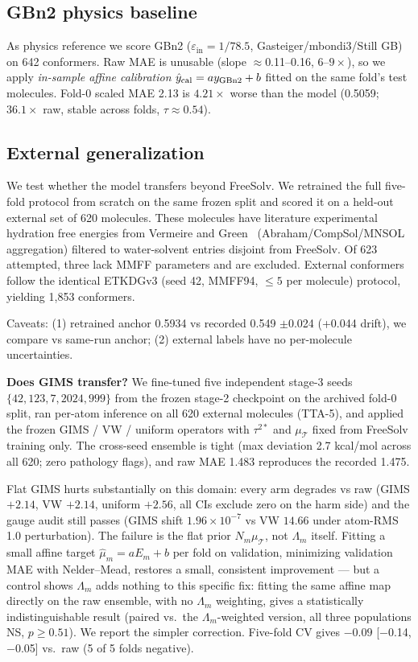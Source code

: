 \documentclass{article}
\begin{document}
\subsection{GBn2 physics baseline}

As physics reference we score GBn2 ($\varepsilon_{\text{in}}=1/78.5$, Gasteiger/mbondi3/Still GB) on 642 conformers. Raw MAE is unusable (slope $\approx$0.11--0.16, $6$--$9\times$), so we apply \emph{in-sample affine calibration} $\hat y_{\rm cal}=a y_{\rm GBn2}+b$ fitted on the same fold's test molecules. Fold-0 scaled MAE 2.13 is $4.21\times$ worse than the model (0.5059; $36.1\times$ raw, stable across folds, $\tau\approx0.54$).

\subsection{External generalization}

We test whether the model transfers beyond FreeSolv. We retrained the full
five-fold protocol from scratch on the same frozen split and scored it on a
held-out external set of 620 molecules. These molecules have literature
experimental hydration free energies from Vermeire and Green~\cite{vermeire2021}
(Abraham/CompSol/MNSOL aggregation) filtered to water-solvent entries disjoint
from FreeSolv. Of 623 attempted, three lack MMFF parameters and are excluded.
External conformers follow the identical ETKDGv3 (seed 42, MMFF94, $\le5$ per
molecule) protocol, yielding 1{,}853 conformers.

Caveats: (1) retrained anchor 0.5934 vs recorded 0.549 $\pm$0.024 (+0.044 drift), we compare vs same-run anchor; (2) external labels have no per-molecule uncertainties.

\textbf{Does GIMS transfer?} We fine-tuned five independent stage-3 seeds
$\{42,123,7,2024,999\}$ from the frozen stage-2 checkpoint on the archived
fold-0 split, ran per-atom inference on all 620 external molecules (TTA-5),
and applied the frozen GIMS / VW / uniform operators with $\tau^{2*}$ and
$\mu_{\mathcal T}$ fixed from FreeSolv training only. The cross-seed ensemble
is tight (max deviation 2.7 kcal/mol across all 620; zero pathology flags),
and raw MAE 1.483 reproduces the recorded 1.475.

Flat GIMS hurts substantially on this domain: every arm degrades vs raw (GIMS
$+2.14$, VW $+2.14$, uniform $+2.56$, all CIs exclude zero on the harm side)
and the gauge audit still passes (GIMS shift $1.96\times10^{-7}$ vs VW $14.66$
under atom-RMS 1.0 perturbation). The failure is the flat prior
$N_m\mu_{\mathcal T}$, not $\Lambda_m$ itself. Fitting a small affine target $\hat\mu_m=aE_m+b$ per fold on validation,
minimizing validation MAE with Nelder--Mead, restores a small, consistent
improvement — but a control shows $\Lambda_m$ adds nothing to this specific
fix: fitting the same affine map directly on the raw ensemble, with no
$\Lambda_m$ weighting, gives a statistically indistinguishable result
(paired vs.\ the $\Lambda_m$-weighted version, all three populations NS,
$p\ge0.51$). We report the simpler correction. Five-fold CV gives $-0.09$
[$-$0.14,$-$0.05] vs.\ raw (5 of 5 folds negative).
\end{document}
